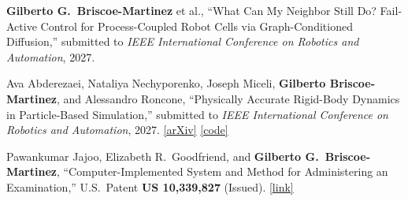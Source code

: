 \begin{pubSubsectionNum}
  \item \textbf{Gilberto G.\ Briscoe-Martinez} et al., ``What Can My Neighbor Still Do? Fail-Active Control for Process-Coupled Robot Cells via Graph-Conditioned Diffusion,'' submitted to \textit{IEEE International Conference on Robotics and Automation}, 2027.
  \item Ava Abderezaei, Nataliya Nechyporenko, Joseph Miceli, \textbf{Gilberto Briscoe-Martinez}, and Alessandro Roncone, ``Physically Accurate Rigid-Body Dynamics in Particle-Based Simulation,'' submitted to \textit{IEEE International Conference on Robotics and Automation}, 2027. \href{https://arxiv.org/abs/2603.14634}{[\underline{arXiv}]} \href{https://github.com/HIRO-group/newton}{[\underline{code}]}
\end{pubSubsectionNum}


\begin{pubSubsectionNum}
  \item Pawankumar Jajoo, Elizabeth R.\ Goodfriend, and \textbf{Gilberto G.\ Briscoe-Martinez}, ``Computer-Implemented System and Method for Administering an Examination,'' U.S.\ Patent \textbf{US 10,339,827} (Issued). \href{https://patents.google.com/patent/US10339827B2}{[\underline{link}]}
\end{pubSubsectionNum}
